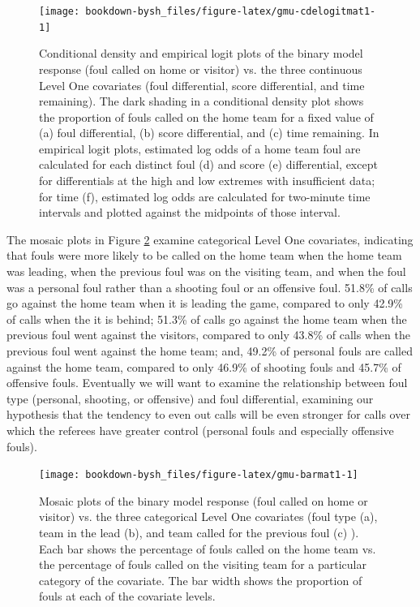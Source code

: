 \documentclass[
]{krantz}
\begin{document}
\begin{figure}

{\centering \texttt{[image: bookdown-bysh\_files/figure-latex/gmu-cdelogitmat1-1]} 

}

\caption{Conditional density and empirical logit plots of the binary model response (foul called on home or visitor) vs. the three continuous Level One covariates (foul differential, score differential, and time remaining).  The dark shading in a conditional density plot shows the proportion of fouls called on the home team for a fixed value of (a) foul differential, (b) score differential, and (c) time remaining.  In empirical logit plots, estimated log odds of a home team foul are calculated for each distinct foul (d) and score (e) differential, except for differentials at the high and low extremes with insufficient data; for time (f), estimated log odds are calculated for two-minute time intervals and plotted against the midpoints of those interval.}\label{fig:gmu-cdelogitmat1}
\end{figure}

The mosaic plots in Figure \ref{fig:gmu-barmat1} examine categorical Level One covariates, indicating that fouls were more likely to be called on the home team when the home team was leading, when the previous foul was on the visiting team, and when the foul was a personal foul rather than a shooting foul or an offensive foul. 51.8\% of calls go against the home team when it is leading the game, compared to only 42.9\% of calls when the it is behind; 51.3\% of calls go against the home team when the previous foul went against the visitors, compared to only 43.8\% of calls when the previous foul went against the home team; and, 49.2\% of personal fouls are called against the home team, compared to only 46.9\% of shooting fouls and 45.7\% of offensive fouls. Eventually we will want to examine the relationship between foul type (personal, shooting, or offensive) and foul differential, examining our hypothesis that the tendency to even out calls will be even stronger for calls over which the referees have greater control (personal fouls and especially offensive fouls).

\begin{figure}

{\centering \texttt{[image: bookdown-bysh\_files/figure-latex/gmu-barmat1-1]} 

}

\caption{Mosaic plots of the binary model response (foul called on home or visitor) vs. the three categorical Level One covariates (foul type (a), team in the lead (b), and team called for the previous foul (c) ).  Each bar shows the percentage of fouls called on the home team vs. the percentage of fouls called on the visiting team for a particular category of the covariate.  The bar width shows the proportion of fouls at each of the covariate levels.}\label{fig:gmu-barmat1}
\end{figure}
\end{document}
